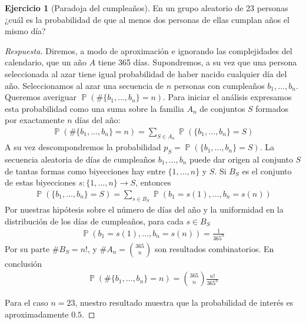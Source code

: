\documentclass{article}
\DeclareMathOperator{\prob}{\mathbb{P}}
\theoremstyle{definition}
\newtheorem{exercise}{Ejercicio}
\begin{document}
\begin{exercise}[Paradoja del cumpleaños]
En un grupo aleatorio de 23 personas ¿cuál es la probabilidad de que al menos dos personas de ellas cumplan años el mismo día?
\end{exercise}
\begin{proof}[Respuesta]
Diremos, a modo de aproximación e ignorando las complejidades del calendario, que un año $A$ tiene 365 días.
Supondremos, a su vez que una persona seleccionada al azar tiene igual probabilidad de haber nacido cualquier día del año.
Seleccionamos al azar una secuencia de $n$ personas con cumpleaños $b_1, \dots, b_n$.
Queremos averiguar $\prob(\# \{b_1, \dots, b_n\} = n)$.
Para iniciar el análisis expresamos esta probabilidad como una suma sobre la familia $A_n$ de conjuntos $S$ formados por exactamente $n$ días del año: 
\begin{align}
    \prob(\# \{b_1, \dots, b_n\} = n) 
    = 
    \sum_{S \in A_n} \prob(\{b_1, \dots, b_n\} = S)
\end{align}
A su vez descompondremos la probabilidad $p_S = \prob(\{b_1, \dots, b_n\} = S)$.
La secuencia aleatoria de días de cumpleaños $b_1, \dots, b_n$ puede dar origen al conjunto $S$ de tantas formas como biyecciones hay entre $\{1, \dots, n\}$ y $S$.
Si $B_S$ es el conjunto de estas biyecciones $s : \{1, \dots, n\} \rightarrow S$, entonces
\begin{align}
    \prob(\{b_1, \dots, b_n\} = S)
    =
    \sum_{s \in B_S} \prob(b_1 = s(1), \dots, b_n = s(n))
\end{align}
Por nuestras hipótesis sobre el número de días del año y la uniformidad en la distribución de los días de cumpleaños, para cada $s \in B_S$ \begin{align}
    \prob(b_1 = s(1), \dots, b_n = s(n))
    =
    \frac{1}{365^n}
\end{align}
Por su parte $\# B_S = n!$, y $\# A_n = \binom{365}{n}$ son resultados combinatorios.
En conclusión
\begin{align}
    \prob(\# \{b_1, \dots, b_n\} = n)
    =
    \binom{365}{n} \frac{n!}{365^n}
\end{align}

Para el caso $n = 23$, nuestro resultado muestra que la probabilidad de interés es aproximadamente $0.5$.
\end{proof}

\end{document}
